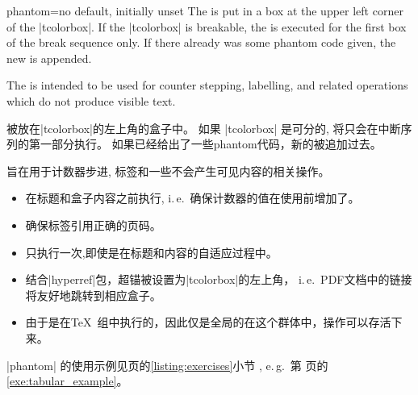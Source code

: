 \begin{docTcbKey}{phantom}{=}{no default, initially unset}
The  is put in a box at the upper left corner of the |tcolorbox|.
If the |tcolorbox| is breakable, the  is executed for the first box of
the break sequence only. If there already was some phantom code given, the
new  is appended.\par
The  is intended to be used for counter stepping, labelling, and
related operations which do not produce visible text.

被放在|tcolorbox|的左上角的盒子中。%
如果 |tcolorbox| 是可分的,  将只会在中断序列的第一部分执行。%
如果已经给出了一些phantom代码，新的被追加过去。\par
{}旨在用于计数器步进, 标签和一些不会产生可见内容的相关操作。
\begin{itemize}
\item 
在标题和盒子内容之前执行, i.\,e.\ 确保计数器的值在使用前增加了。
\item %
确保标签引用正确的页码。
\item 
只执行一次,即使是在标题和内容的自适应过程中。
\item 
结合|hyperref|包，超锚被设置为|tcolorbox|的左上角， i.\,e.\ PDF文档中的链接将友好地跳转到相应盒子。

\item 
由于是在\TeX\ 组中执行的，因此仅是全局的在这个群体中，操作可以存活下来。
\end{itemize}
|phantom| 的使用示例见\pageref{listing:exercises}页的\ref{listing:exercises}小节
, e.\,g.\ 第 \pageref{exe:tabular_example} 页的 \ref{exe:tabular_example}。
\end{docTcbKey}


